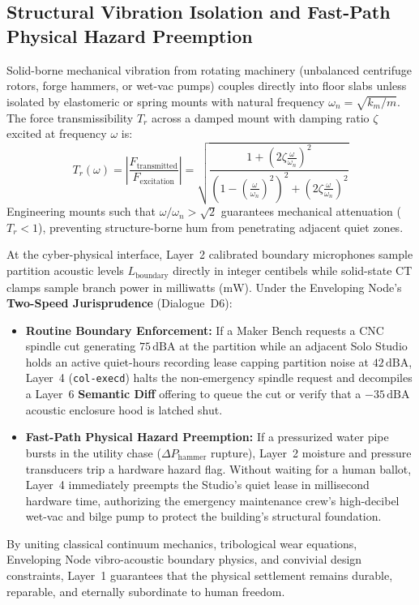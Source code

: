 \subsection{Structural Vibration Isolation and Fast-Path Physical Hazard Preemption}
Solid-borne mechanical vibration from rotating machinery (unbalanced centrifuge rotors, forge hammers, or wet-vac pumps) couples directly into floor slabs unless isolated by elastomeric or spring mounts with natural frequency $\omega_n = \sqrt{k_m / m}$. The force transmissibility $T_r$ across a damped mount with damping ratio $\zeta$ excited at frequency $\omega$ is:
\begin{equation}
T_r(\omega) = \left| \frac{F_{\mathrm{transmitted}}}{F_{\mathrm{excitation}}} \right| = \sqrt{ \frac{1 + \left(2 \zeta \frac{\omega}{\omega_n}\right)^2}{\left(1 - \left(\frac{\omega}{\omega_n}\right)^2\right)^2 + \left(2 \zeta \frac{\omega}{\omega_n}\right)^2} }
\label{eq:vibration_transmissibility}
\end{equation}
Engineering mounts such that $\omega / \omega_n > \sqrt{2}$ guarantees mechanical attenuation ($T_r < 1$), preventing structure-borne hum from penetrating adjacent quiet zones.

At the cyber-physical interface, Layer~2 calibrated boundary microphones sample partition acoustic levels $L_{\mathrm{boundary}}$ directly in integer centibels while solid-state CT clamps sample branch power in milliwatts ($\mathrm{mW}$). Under the Enveloping Node's \textbf{Two-Speed Jurisprudence} (Dialogue~D6):
\begin{itemize}
    \item \textbf{Routine Boundary Enforcement:} If a Maker Bench requests a CNC spindle cut generating $75\,\mathrm{dBA}$ at the partition while an adjacent Solo Studio holds an active quiet-hours recording lease capping partition noise at $42\,\mathrm{dBA}$, Layer~4 (\texttt{col-execd}) halts the non-emergency spindle request and decompiles a Layer~6 \textbf{Semantic Diff} offering to queue the cut or verify that a $-35\,\mathrm{dBA}$ acoustic enclosure hood is latched shut.
    \item \textbf{Fast-Path Physical Hazard Preemption:} If a pressurized water pipe bursts in the utility chase ($\Delta P_{\mathrm{hammer}}$ rupture), Layer~2 moisture and pressure transducers trip a hardware hazard flag. Without waiting for a human ballot, Layer~4 immediately preempts the Studio's quiet lease in millisecond hardware time, authorizing the emergency maintenance crew's high-decibel wet-vac and bilge pump to protect the building's structural foundation.
\end{itemize}

By uniting classical continuum mechanics, tribological wear equations, Enveloping Node vibro-acoustic boundary physics, and convivial design constraints, Layer~1 guarantees that the physical settlement remains durable, reparable, and eternally subordinate to human freedom.
